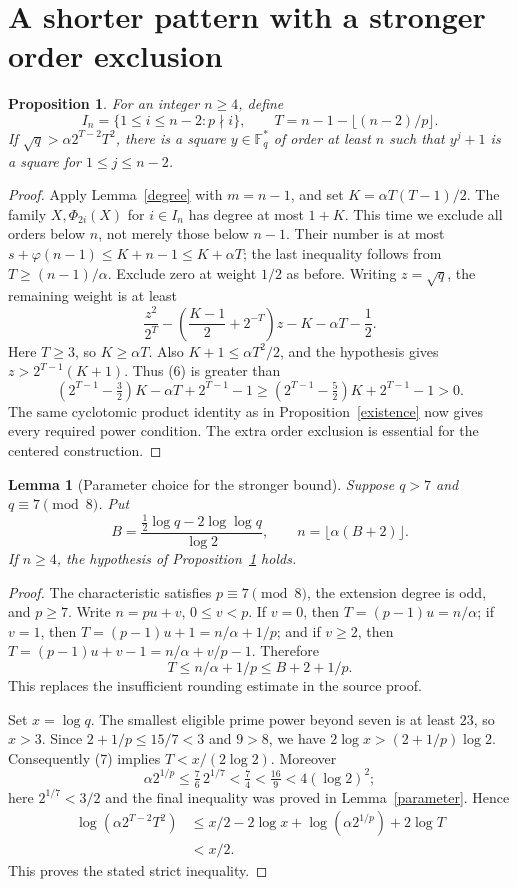 \documentclass[11pt,a4paper]{article}
\newtheorem{lemma}[theorem]{Lemma}
\newtheorem{proposition}[theorem]{Proposition}
\newcommand{\F}{\mathbb F}
\begin{document}
\section{A shorter pattern with a stronger order exclusion}
\begin{proposition}\label{centered-pattern}
For an integer $n\ge4$, define
\[
 I_n=\{1\le i\le n-2:p\nmid i\},\qquad
 T=n-1-\lfloor(n-2)/p\rfloor.
\]
If $\sqrt q>\alpha2^{T-2}T^2$, there is a square $y\in\F_q^*$
of order at least $n$ such that $y^j+1$ is a square for
$1\le j\le n-2$.
\end{proposition}
\begin{proof}
Apply Lemma~\ref{degree} with $m=n-1$, and set
$K=\alpha T(T-1)/2$. The family $X,\Phi_{2i}(X)$ for $i\in I_n$
has degree at most $1+K$. This time we exclude all orders below $n$,
not merely those below $n-1$. Their number is at most
$s+\varphi(n-1)\le K+n-1\le K+\alpha T$; the last inequality follows
from $T\ge(n-1)/\alpha$. Exclude zero at weight $1/2$ as before.
Writing $z=\sqrt q$, the remaining weight is at least
\[
 \frac {z^2}{2^T}
 -\left(\frac{K-1}{2}+2^{-T}\right)z-K-\alpha T-\frac12.
 \tag{6}
\]
Here $T\ge3$, so $K\ge\alpha T$. Also
$K+1\le\alpha T^2/2$, and the hypothesis gives
$z>2^{T-1}(K+1)$. Thus (6) is greater than
\[
 (2^{T-1}-\tfrac32)K-\alpha T+2^{T-1}-1
 \ge(2^{T-1}-\tfrac52)K+2^{T-1}-1>0.
\]
The same cyclotomic product identity as in
Proposition~\ref{existence} now gives every required power condition.
The extra order exclusion is essential for the centered construction.
\end{proof}

\begin{lemma}[Parameter choice for the stronger bound]\label{parameter-plus-two}
Suppose $q>7$ and $q\equiv7\pmod8$. Put
\[
 B=\frac{\frac12\log q-2\log\log q}{\log2},\qquad
 n=\lfloor\alpha(B+2)\rfloor.
\]
If $n\ge4$, the hypothesis of Proposition~\ref{centered-pattern} holds.
\end{lemma}
\begin{proof}
The characteristic satisfies $p\equiv7\pmod8$, the extension degree is
odd, and $p\ge7$. Write $n=pu+v$, $0\le v<p$.
If $v=0$, then $T=(p-1)u=n/\alpha$; if $v=1$, then
$T=(p-1)u+1=n/\alpha+1/p$; and if $v\ge2$, then
$T=(p-1)u+v-1=n/\alpha+v/p-1$. Therefore
\[
 T\le n/\alpha+1/p\le B+2+1/p. \tag{7}
\]
This replaces the insufficient rounding estimate in the source proof.

Set $x=\log q$. The smallest eligible prime power beyond seven is
at least $23$, so $x>3$. Since $2+1/p\le15/7<3$ and $9>8$,
we have $2\log x>(2+1/p)\log2$. Consequently (7) implies
$T<x/(2\log2)$. Moreover
\[
 \alpha2^{1/p}\le\tfrac76\,2^{1/7}
 <\tfrac74<\tfrac{16}{9}<4(\log2)^2;
\]
here $2^{1/7}<3/2$ and the final inequality was proved in
Lemma~\ref{parameter}. Hence
\begin{align*}
 \log(\alpha2^{T-2}T^2)
 &\le x/2-2\log x+\log(\alpha2^{1/p})+2\log T\\
 &<x/2.
\end{align*}
This proves the stated strict inequality.
\end{proof}
\end{document}
